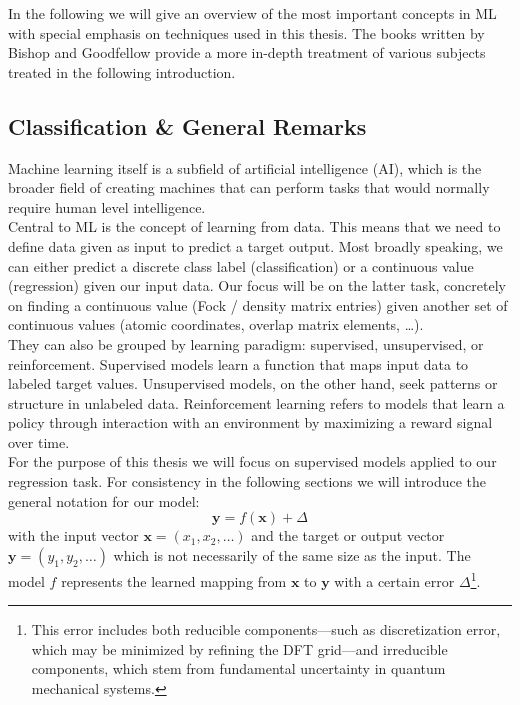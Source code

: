 In the following we will give an overview of the most important concepts in ML with special emphasis on techniques used in this thesis. The books written by Bishop \parencite{ref:bishop2006pattern} and Goodfellow \parencite{ref:goodfellow2016deep} provide a more in-depth treatment of various subjects treated in the following introduction.
\subsection{Classification \& General Remarks}
\label{subsec:background_ml_general_concepts}
Machine learning itself is a subfield of artificial intelligence (AI), which is the broader field of creating machines that can perform tasks that would normally require human level intelligence. \\
Central to ML is the concept of learning from data. This means that we need to define data given as input to predict a target output. Most broadly speaking, we can either predict a discrete class label (classification) or a continuous value (regression) given our input data. Our focus will be on the latter task, concretely on finding a continuous value (Fock / density matrix entries) given another set of continuous values (atomic coordinates, overlap matrix elements, \dots). \\
They can also be grouped by learning paradigm: supervised, unsupervised, or reinforcement. Supervised models learn a function that maps input data to labeled target values. Unsupervised models, on the other hand, seek patterns or structure in unlabeled data. Reinforcement learning refers to models that learn a policy through interaction with an environment by maximizing a reward signal over time.\\

For the purpose of this thesis we will focus on supervised models applied to our regression task. For consistency in the following sections we will introduce the general notation for our model: 
\begin{equation}
    \label{eq:general_ML_model_formula}
    \mathbf{y} = f(\mathbf{x}) + \Delta
\end{equation}
with the input vector $\mathbf{x} = (x_1, x_2, \dots)$ and the target or output vector $\mathbf{y} = (y_1, y_2, \dots)$ which is not necessarily of the same size as the input. The model $f$ represents the learned mapping from $\mathbf{x}$ to $\mathbf{y}$ with a certain 
error $\Delta$\footnote{This error includes both reducible components—such as discretization error, which may be minimized by refining the DFT grid—and irreducible components, which stem from fundamental uncertainty in quantum mechanical systems.}. 

